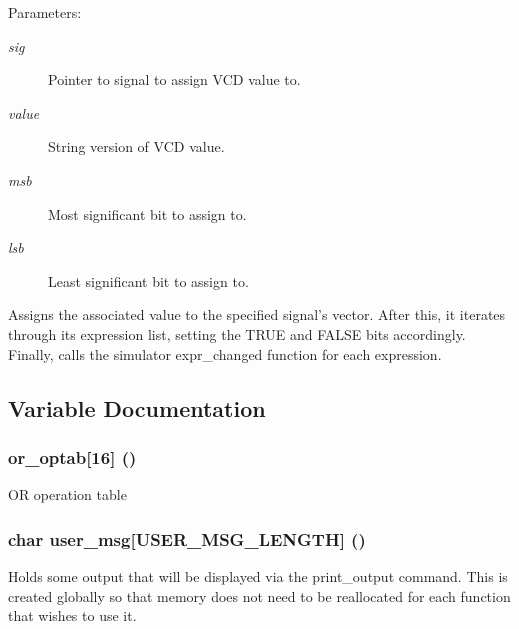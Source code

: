 \begin{Desc}
\item[Parameters:]
\begin{description}
\item[{\em sig}]Pointer to signal to assign VCD value to. \item[{\em value}]String version of VCD value. \item[{\em msb}]Most significant bit to assign to. \item[{\em lsb}]Least significant bit to assign to.\end{description}
\end{Desc}
Assigns the associated value to the specified signal's vector. After this, it iterates through its expression list, setting the TRUE and FALSE bits accordingly. Finally, calls the simulator expr\_\-changed function for each expression. 

\subsection{Variable Documentation}
\subsubsection{ {\bf or\_\-optab}[16] ()}\label{signal_8c_a0}


OR operation table 
\subsubsection{\setlength{\rightskip}{0pt plus 5cm}char {\bf user\_\-msg}[USER\_\-MSG\_\-LENGTH] ()}\label{signal_8c_a1}


Holds some output that will be displayed via the print\_\-output command. This is created globally so that memory does not need to be reallocated for each function that wishes to use it. 